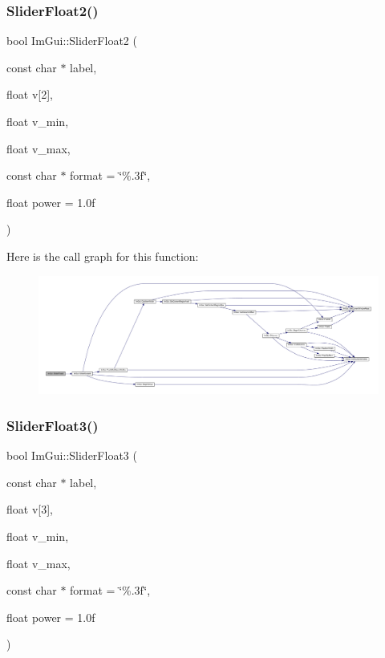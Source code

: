 \subsubsection{\texorpdfstring{Slider\+Float2()}{SliderFloat2()}}
{\footnotesize\ttfamily bool Im\+Gui\+::\+Slider\+Float2 (\begin{DoxyParamCaption}\item[{const char $\ast$}]{label,  }\item[{float}]{v\mbox{[}2\mbox{]},  }\item[{float}]{v\+\_\+min,  }\item[{float}]{v\+\_\+max,  }\item[{const char $\ast$}]{format = {\ttfamily \char`\"{}\%.3f\char`\"{}},  }\item[{float}]{power = {\ttfamily 1.0f} }\end{DoxyParamCaption})}

Here is the call graph for this function\+:
\nopagebreak
\begin{figure}[H]
\begin{center}
\leavevmode
\includegraphics[width=350pt]{namespace_im_gui_a663988b63d70d864e3acfe51f5be602c_cgraph}
\end{center}
\end{figure}
\mbox{\label{namespace_im_gui_a946f179f439f8b94a2c4145d8050d5af}} 
\subsubsection{\texorpdfstring{Slider\+Float3()}{SliderFloat3()}}
{\footnotesize\ttfamily bool Im\+Gui\+::\+Slider\+Float3 (\begin{DoxyParamCaption}\item[{const char $\ast$}]{label,  }\item[{float}]{v\mbox{[}3\mbox{]},  }\item[{float}]{v\+\_\+min,  }\item[{float}]{v\+\_\+max,  }\item[{const char $\ast$}]{format = {\ttfamily \char`\"{}\%.3f\char`\"{}},  }\item[{float}]{power = {\ttfamily 1.0f} }\end{DoxyParamCaption})}

